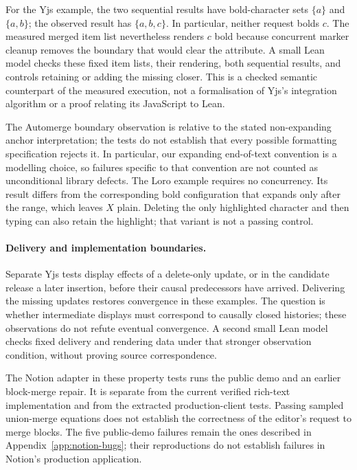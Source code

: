 For the Yjs example, the two sequential results have bold-character sets
$\{a\}$ and $\{a,b\}$; the observed result has $\{a,b,c\}$.
In particular, neither request bolds $c$. The measured
merged item list nevertheless renders $c$ bold because concurrent marker
cleanup removes the boundary that would clear the attribute. A small Lean
model checks these fixed item lists, their rendering, both sequential
results, and controls retaining or adding the missing closer. This is a
checked semantic counterpart of the measured execution, not a formalisation
of Yjs's integration algorithm or a proof relating its JavaScript to Lean.

The Automerge boundary observation is relative to the stated non-expanding
anchor interpretation; the tests do not establish that every possible
formatting specification rejects it. In particular, our expanding
end-of-text convention is a modelling choice, so failures specific to that
convention are not counted as unconditional library defects. The Loro
example requires no concurrency. Its result differs from the corresponding
bold configuration that expands only after the range, which leaves $X$
plain. Deleting the only highlighted character and then typing can also
retain the highlight; that variant is not a passing control.

\paragraph{Delivery and implementation boundaries.}
Separate Yjs tests display effects of a delete-only update, or in the
candidate release a later insertion, before their causal predecessors have
arrived. Delivering the missing updates restores convergence in these
examples. The question is whether intermediate displays must correspond to
causally closed histories; these observations do not refute eventual
convergence. A second small Lean model checks fixed delivery and rendering
data under that stronger observation condition, without proving source
correspondence.

The Notion adapter in these property tests runs the public demo and an
earlier block-merge repair. It is separate from the current verified rich-text
implementation and from the extracted production-client tests. Passing
sampled union-merge equations does not establish the correctness of the
editor's request to merge blocks. The five public-demo failures remain the
ones described in Appendix~\ref{app:notion-bugs}; their reproductions do not
establish failures in Notion's production application.

